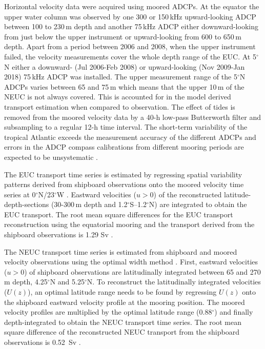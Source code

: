 \documentclass[os, manuscript]{copernicus}
\begin{document}
	Horizontal velocity data were acquired using moored ADCPs. At the equator the upper water column was observed by one 300 or 150$\,$kHz upward-looking ADCP between 100 to 230$\,$m depth and another 75$\,$kHz ADCP either downward-looking from just below the upper instrument or upward-looking from 600 to 650$\,$m depth. Apart from a period between 2006 and 2008, when the upper instrument failed, the velocity measurements cover the whole depth range of the EUC. At 5$^{\circ}$N either a downward- (Jul 2006-Feb 2008) or upward-looking (Nov 2009-Jan 2018) 75$\,$kHz ADCP was installed. The upper measurement range of the 5$^{\circ}$N ADCPs varies between 65 and 75$\,$m which means that the upper 10$\,$m of the NEUC is not always covered. This is accounted for in the model derived transport estimation when compared to observation. The effect of tides is removed from the moored velocity data by a 40-h low-pass Butterworth filter and subsampling to a regular 12-h time interval. The short-term variability of the tropical Atlantic exceeds the measurement accuracy of the different ADCPs and errors in the ADCP compass calibrations from different mooring periods are expected to be unsystematic \citep{Brandt2021a}. 
	
	The EUC transport time series is estimated by regressing spatial variability patterns derived from shipboard observations onto the moored velocity time series at 0$^{\circ}$N/23$^{\circ}$W \citep{Brandt2014, Brandt2016, Brandt2021a}. Eastward velocities ($ u>0 $) of the reconstructed latitude-depth-sections (30-300$\,$m depth and 1.2$^{\circ}$S–1.2$^{\circ}$N) are integrated to obtain the EUC transport. The root mean square differences for the EUC transport reconstruction using the equatorial mooring and the transport derived from the shipboard observations is 1.29 Sv \citep{Brandt2014}.
	
	The NEUC transport time series is estimated from shipboard and moored velocity observations using the optimal width method \citep{Burmeister2020}. First, eastward velocities ($ u>0 $) of shipboard observations are latitudinally integrated between 65 and 270$\,$m depth, 4.25$^{\circ}$N and 5.25$^{\circ}$N. To reconstruct the latitudinally integrated velocities ($ U(z) $), an optimal latitude range needs to be found by regressing $ U(z) $ onto the shipboard eastward velocity profile at the mooring position. The moored velocity profiles are multiplied by the optimal latitude range (0.88$^{\circ}$) and finally depth-integrated to obtain the NEUC transport time series. The root mean square difference of the reconstructed NEUC transport from the shipboard observations is 0.52 $\,$Sv \citep{Burmeister2020}.
	
\end{document}
